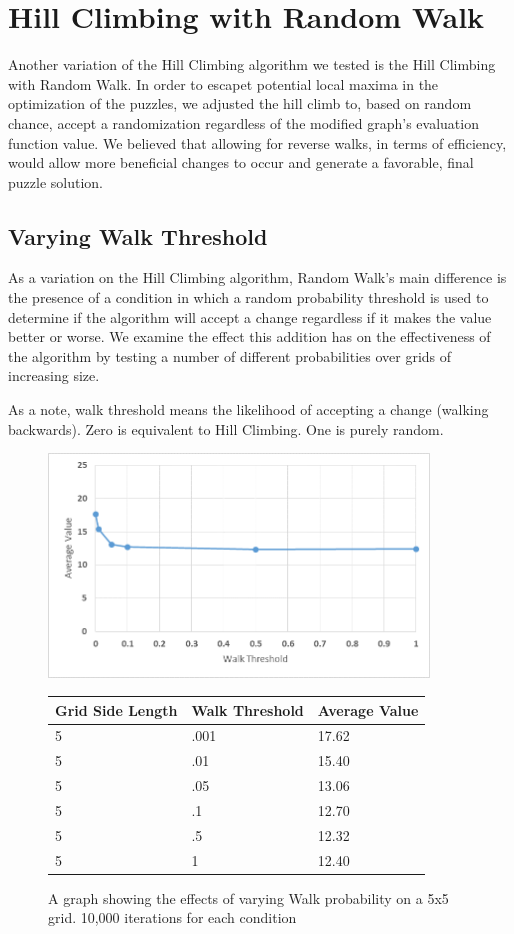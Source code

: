 \documentclass[12pt]{article}
\begin{document}
\section*{Hill Climbing with Random Walk}

Another variation of the Hill Climbing algorithm we tested is the Hill Climbing with Random Walk. In order to escapet potential local maxima in the optimization of the puzzles, we adjusted the hill climb to, based on random chance, accept a randomization regardless of the modified graph's evaluation function value. We believed that allowing for reverse walks, in terms of efficiency, would allow more beneficial changes to occur and generate a favorable, final puzzle solution.

\subsection*{Varying Walk Threshold}
As a variation on the Hill Climbing algorithm, Random Walk's main difference is the presence of a condition in which a random probability threshold is used to determine if the algorithm will accept a change regardless if it makes the value better or worse. We examine the effect this addition has on the effectiveness of the algorithm by testing a number of different probabilities over grids of increasing size. \newline

As a note, walk threshold means the likelihood of accepting a change (walking backwards). Zero is equivalent to Hill Climbing. One is purely random.

\begin{figure}[H]
    \centering
    \includegraphics[width=0.9\textwidth]{5x5_RWprob}
\begin{tabular}{ |p{4cm}||p{4cm}|p{4cm}|  }
 \hline
Grid Side Length&Walk Threshold&Average Value\\
 \hline
5&.001&17.62\\
5&.01&15.40\\
5&.05&13.06\\
5&.1&12.70\\
5&.5&12.32\\
5&1&12.40\\
 \hline
\end{tabular}
    \caption{A graph showing the effects of varying Walk probability on a 5x5 grid. 10,000 iterations for each condition}
    \label{fig:RWprob5x5}
\end{figure}
\end{document}
